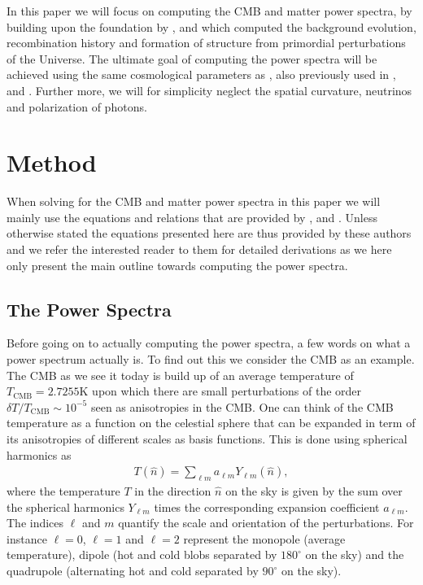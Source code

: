\documentclass[twocolumn]{aastex62}
\begin{document}
In this paper we will focus on computing the CMB and matter power spectra, by building upon the foundation by \cite{stutzer:2020a}, \cite{stutzer:2020b} and \cite{stutzer:2020c} which computed the background evolution, recombination history and formation of structure from primordial perturbations of the Universe. The ultimate goal of computing the power spectra will be achieved using the same cosmological parameters as \cite{callin:2006}, also previously used in \cite{stutzer:2020a}, \cite{stutzer:2020b} and \cite{stutzer:2020c}. Further more, we will for simplicity neglect the spatial curvature, neutrinos and polarization of photons. 

\section{Method} \label{sec:Method}
When solving for the CMB and matter power spectra in this paper we will mainly use the equations and relations that are provided by \cite{winther:2020c}, \cite{callin:2006} and \cite{dodelson:2003}. Unless otherwise stated the equations presented here are thus provided by these authors and we refer the interested reader to them for detailed derivations as we here only present the main outline towards computing the power spectra.  

\subsection{The Power Spectra} \label{subsec:spectra}
Before going on to actually computing the power spectra, a few words on what a power spectrum actually is. To find out this we consider the CMB as an example. The CMB as we see it today is build up of an average temperature of $T_\mathrm{CMB} = 2.7255\mathrm{K}$ upon which there are small perturbations of the order $\delta T / T_\mathrm{CMB} \sim 10^{-5}$ seen as anisotropies in the CMB. One can think of the CMB temperature as a function on the celestial sphere that can be expanded in term of its anisotropies of different scales as basis functions. This is done using spherical harmonics as 
\begin{align}
    T(\hat{n}) = \sum_{\ell m} a_{\ell m} Y_{\ell m}(\hat{n}),
\end{align}
where the temperature $T$ in the direction $\hat{n}$ on the sky is given by the sum over the spherical harmonics $Y_{\ell m}$ times the corresponding expansion coefficient $a_{\ell m}$. The indices $\ell$ and $m$ quantify the scale and orientation of the perturbations. For instance $\ell = 0$, $\ell = 1$ and $\ell = 2$ represent the monopole (average temperature), dipole (hot and cold blobs separated by $180^\circ$ on the sky) and the quadrupole (alternating hot and cold separated by $90^\circ$ on the sky).
\end{document}
